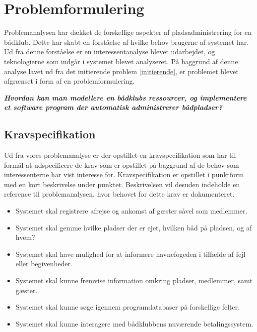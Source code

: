 \chapter{Problemformulering}
\label{cha:problemformulering}


Problemanalysen har dækket de forskellige aspekter af pladsadministrering for en bådklub.
Dette har skabt en forståelse af hvilke behov brugerne af systemet har.
Ud fra denne forståelse er en interessentanalyse blevet udarbejdet, og teknologierne som indgår i systemet blevet analyseret. På baggrund af denne analyse lavet ud fra det initierende problem \ref{initierende}, er problemet blevet afgrænset i form af en problemformulering.

\begin{displayquote}
	\textbf{\textit{Hvordan kan man modellere en bådklubs ressourcer, og implementere et software program der automatisk administrerer bådpladser?}}
\end{displayquote}

\section{Kravspecifikation} %
\label{sec:Kravspecifikation}

Ud fra vores problemanalyse er der opstillet en kravspecifikation som har til
formål at udspecificere de krav som er opstillet på baggrund af de behov som interessenterne har vist interesse for. 
Kravspecifikation er opstillet i punktform med en kort beskrivelse 
under punktet. Beskrivelsen vil desuden indeholde en reference til problemanalysen, hvor 
behovet for dette krav er dokumenteret.
 

\begin{itemize}
  \item Systemet skal registrere afrejse og ankomst af gæster såvel som medlemmer.
  \item Systemet skal gemme hvilke pladser der er ejet, hvilken båd på pladsen, og af hvem?
  \item Systemet skal have mulighed for at informere havnefogeden i tilfælde af fejl eller begivenheder.
  \item Systemet skal kunne fremvise information omkring pladser, medlemmer, samt gæster.
  \item Systemet skal kunne søge igennem programdatabaser på forskellige felter.	
  \item Systemet skal kunne interagere med bådklubbens nuværende betalingssystem.
\end{itemize}


